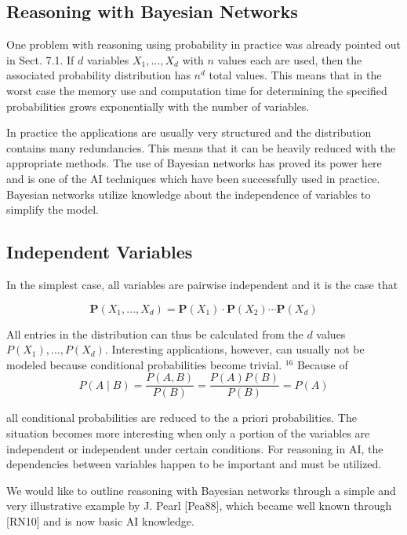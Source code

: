 \documentclass[10pt]{book}
\begin{document}
\subsection{Reasoning with Bayesian Networks}
One problem with reasoning using probability in practice was already pointed out in Sect. 7.1. If $d$ variables $X_{1}, \ldots, X_{d}$ with $n$ values each are used, then the associated probability distribution has $n^{d}$ total values. This means that in the worst case the memory use and computation time for determining the specified probabilities grows exponentially with the number of variables.

In practice the applications are usually very structured and the distribution contains many redundancies. This means that it can be heavily reduced with the appropriate methods. The use of Bayesian networks has proved its power here and is one of the AI techniques which have been successfully used in practice. Bayesian networks utilize knowledge about the independence of variables to simplify the model.

\subsection{Independent Variables}
In the simplest case, all variables are pairwise independent and it is the case that

$$
\boldsymbol{P}\left(X_{1}, \ldots, X_{d}\right)=\boldsymbol{P}\left(X_{1}\right) \cdot \boldsymbol{P}\left(X_{2}\right) \cdots \boldsymbol{P}\left(X_{d}\right)
$$

All entries in the distribution can thus be calculated from the $d$ values $P\left(X_{1}\right), \ldots, P\left(X_{d}\right)$. Interesting applications, however, can usually not be modeled because conditional probabilities become trivial. ${ }^{16}$ Because of
$$
P(A \mid B)=\frac{P(A, B)}{P(B)}=\frac{P(A) P(B)}{P(B)}=P(A)
$$

all conditional probabilities are reduced to the a priori probabilities. The situation becomes more interesting when only a portion of the variables are independent or independent under certain conditions. For reasoning in AI, the dependencies between variables happen to be important and must be utilized.

We would like to outline reasoning with Bayesian networks through a simple and very illustrative example by J. Pearl [Pea88], which became well known through [RN10] and is now basic AI knowledge.
\end{document}
